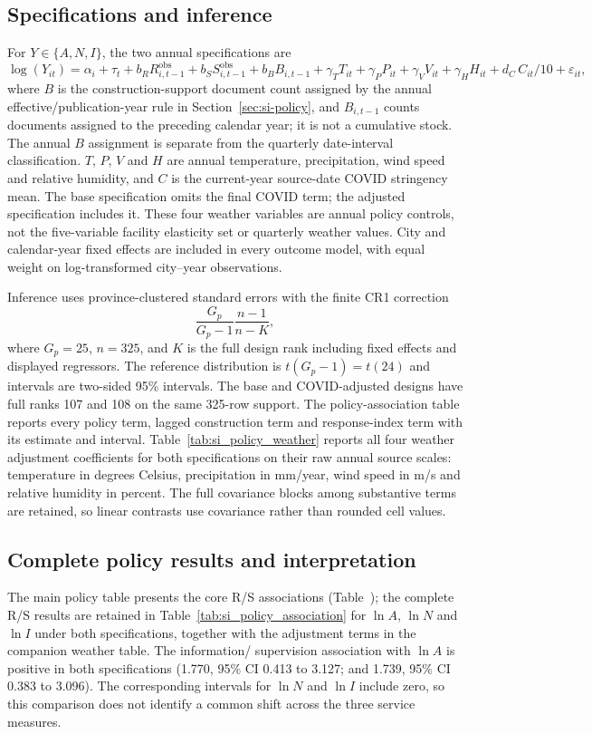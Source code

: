 \subsection{Specifications and inference}
For $Y\in\{A,N,I\}$, the two annual specifications are
\begin{equation}
\log(Y_{it}) = \alpha_i+\tau_t
 + b_R R^{\mathrm{obs}}_{i,t-1}
 + b_S S^{\mathrm{obs}}_{i,t-1}
 + b_B B_{i,t-1}
 + \gamma_T T_{it}+\gamma_P P_{it}
 +\gamma_V V_{it}+\gamma_H H_{it}
 + d_C\,C_{it}/10 + \varepsilon_{it},
\label{eq:annual-policy-association}
\end{equation}
where $B$ is the construction-support document count assigned by the annual
effective/publication-year rule in Section~\ref{sec:si-policy}, and $B_{i,t-1}$ counts documents assigned
to the preceding calendar year; it is not a cumulative stock.  The annual $B$
assignment is separate from the quarterly date-interval classification.  $T$, $P$, $V$ and $H$ are annual temperature,
precipitation, wind speed and
relative humidity, and $C$ is the current-year source-date COVID stringency
mean.  The base specification omits the final COVID term; the adjusted
specification includes it.  These four weather variables are annual policy
controls, not the five-variable facility elasticity set or quarterly weather
values.  City and calendar-year fixed effects are included in every outcome
model, with equal weight on log-transformed city--year observations.

Inference uses province-clustered standard errors with the finite CR1
correction
\[
 \frac{G_p}{G_p-1}\frac{n-1}{n-K},
\]
where $G_p=25$, $n=325$, and $K$ is the full design rank including fixed
effects and displayed regressors.  The reference distribution is
$t(G_p-1)=t(24)$ and intervals are two-sided 95\% intervals.  The base and
COVID-adjusted designs have full ranks 107 and 108 on the same 325-row
support.  The policy-association table reports every policy term, lagged
construction term and response-index term with its estimate and interval.
Table~\ref{tab:si_policy_weather} reports all four weather adjustment
coefficients for both specifications on their raw annual source scales:
temperature in degrees Celsius, precipitation in mm/year, wind speed in m/s
and relative humidity in percent.  The full covariance blocks among substantive
terms are retained, so linear contrasts use covariance rather than rounded cell
values.

\subsection{Complete policy results and interpretation}
The main policy table presents the core R/S associations (Table~);
the complete R/S results are retained in Table~\ref{tab:si_policy_association}
for $\ln A$, $\ln N$ and $\ln I$ under both specifications, together with
the adjustment terms in the companion weather table.  The information/
supervision association with $\ln A$ is positive in both specifications
(1.770, 95\% CI 0.413 to 3.127; and 1.739, 95\% CI 0.383 to
3.096).  The corresponding intervals for $\ln N$ and $\ln I$ include zero,
so this comparison does not identify a common shift across the three service
measures.

